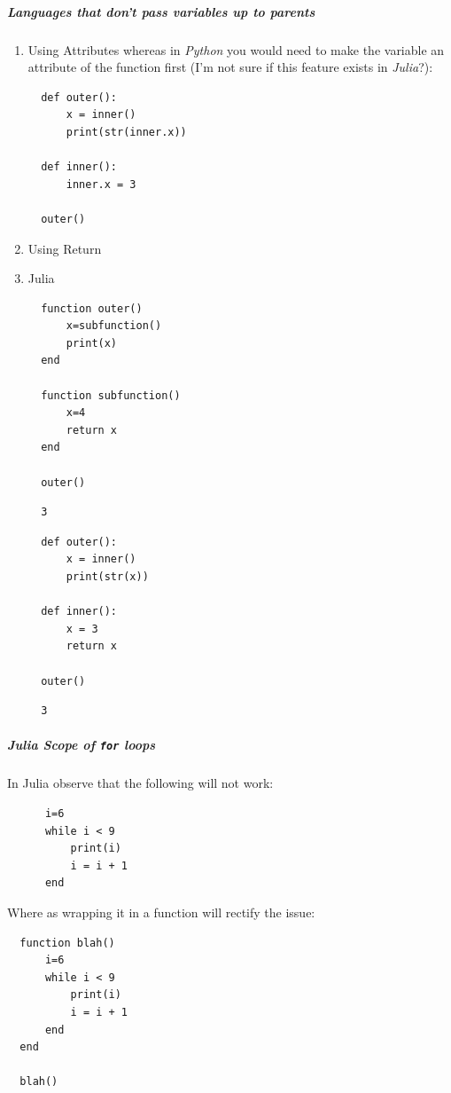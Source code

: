 \documentclass[11pt]{article}
\begin{document}
\subparagraph{Languages that don't pass variables up to parents}
\label{languages-that-dont-pass-variables-up-to-parents}
\begin{enumerate}
\item Using Attributes
\label{using-attributes}
whereas in \emph{Python} you would need to make the variable an attribute of
the function first (I'm not sure if this feature exists in \emph{Julia}?):

\begin{verbatim}
  def outer():
      x = inner()
      print(str(inner.x))

  def inner():
      inner.x = 3

  outer()
\end{verbatim}

\item Using Return
\label{using-return}

\item Julia
\label{julia}
\begin{verbatim}
  function outer()
      x=subfunction()
      print(x)
  end

  function subfunction()
      x=4
      return x
  end

  outer()
\end{verbatim}

\begin{verbatim}
  3
\end{verbatim}

\begin{verbatim}
  def outer():
      x = inner()
      print(str(x))

  def inner():
      x = 3
      return x

  outer()
\end{verbatim}

\begin{verbatim}
  3
\end{verbatim}
\end{enumerate}

\subparagraph{Julia Scope of \texttt{for} loops}
\label{julia-scope-of-for-loops}
In Julia observe that the following will not work:

\begin{verbatim}
      i=6
      while i < 9
          print(i)
          i = i + 1
      end
\end{verbatim}

Where as wrapping it in a function will rectify the issue:

\begin{verbatim}
  function blah()
      i=6
      while i < 9
          print(i)
          i = i + 1
      end
  end

  blah()
\end{verbatim}
\end{document}

